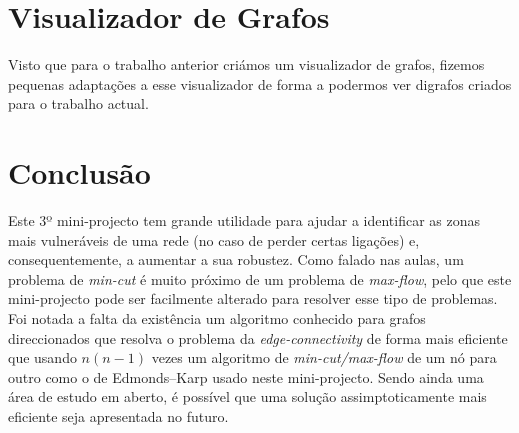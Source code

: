 \documentclass[10pt,a4paper]{article}
\begin{document}
\section{Visualizador de Grafos}
Visto que para o trabalho anterior criámos um visualizador de grafos, fizemos pequenas adaptações a esse visualizador de forma a podermos ver digrafos criados para o trabalho actual.

\section{Conclusão}
Este 3º mini-projecto tem grande utilidade para ajudar a identificar as zonas mais vulneráveis de uma rede (no caso de perder certas ligações) e, consequentemente, a aumentar a sua robustez. Como falado nas aulas, um problema de \textit{min-cut} é muito próximo de um problema de \textit{max-flow}, pelo que este mini-projecto pode ser facilmente alterado para resolver esse tipo de problemas. Foi notada a falta da existência um algoritmo conhecido para grafos direccionados que resolva o problema da \textit{edge-connectivity} de forma mais eficiente que usando $n(n-1)$ vezes um algoritmo de \textit{min-cut/max-flow}  de um nó para outro como o de Edmonds--Karp usado neste mini-projecto. Sendo ainda uma área de estudo em aberto, é possível que uma solução assimptoticamente mais eficiente seja apresentada no futuro.


\nocite{slidesADRC}
\end{document}
